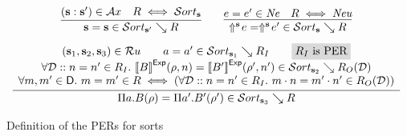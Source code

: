 \begin{figure}
  \[
  \begin{array}{c}
    \infer{
      \tmcst s = \tmcst s \in \persort[\tmcst s'] \searrow R
    }{
      (\tmcst s : \tmcst s') \in \Ax
      &
      R \iff \persort
    }
    \qquad
    \infer{
      \dreflect {\tmcst s} e = \dreflect {\tmcst s} {e'} \in \persort \searrow R
    }{
      e = e' \in \perne
      &
      R \iff \perneu
    }
    \\[8pt]
    \infer{
      \dpi a B \rho = \dpi {a'} {B'} {\rho'} \in \persort[\tmcst s_3] \searrow R
    }{
      \begin{array}{c}
        (\tmcst s_1, \tmcst s_2, \tmcst s_3) \in \Ru
        \qquad
        a = a' \in \persort[\tmcst s_1] \searrow R_I
        \qquad
        \mhighlight {R_I \text{ is PER}}
        \\
        \forall \DD :: n = n' \in R_I.\ \evalexpfunc B {\denvext \rho n} = \evalexpfunc {B'} {\denvext {\rho'} {n'}} \in \persort[\tmcst s_2] \searrow R_O(\DD)
        \\
        \forall m, m' \in \Dom.\ m = m' \in R \iff (\forall \DD :: n = n' \in R_I.\ \evalappfunc m n = \evalappfunc {m'} {n'} \in R_O(\DD))
      \end{array}
    }
  \end{array}
  \]
  \caption{Definition of the \acp{PER} for sorts}
  \label{fig:per-sorts}
\end{figure}
